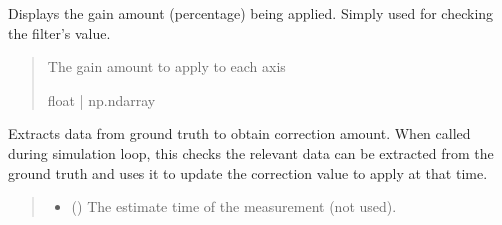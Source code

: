 \documentclass[letterpaper,10pt,english]{sphinxmanual}
\begin{document}
\begin{fulllineitems}
\begin{fulllineitems}
\label{\detokenize{modules/simulation/holonomic:qnav.simulation.holonomic.HolonomicConstraint.filter_gain}}
\pysigstartsignatures
{}
\pysigstopsignatures
\sphinxAtStartPar
Displays the gain amount (percentage) being applied.
Simply used for checking the filter’s value.
\begin{quote}\begin{description}
\sphinxAtStartPar
The gain amount to apply to each axis

\sphinxAtStartPar
float | np.ndarray

\end{description}\end{quote}

\end{fulllineitems}


\begin{fulllineitems}
\label{\detokenize{modules/simulation/holonomic:qnav.simulation.holonomic.HolonomicConstraint.take_measurement}}
\pysigstartsignatures
{}
\pysigstopsignatures
\sphinxAtStartPar
Extracts data from ground truth to obtain correction amount.
When called during simulation loop, this checks the relevant data can
be extracted from the ground truth and uses it to update the
correction value to apply at that time.
\begin{quote}\begin{description}
\begin{itemize}
\item {} 
\sphinxAtStartPar
{} () \textendash{} The estimate time of the measurement (not used).


\end{itemize}
\end{description}
\end{quote}
\end{fulllineitems}
\end{fulllineitems}
\end{document}
